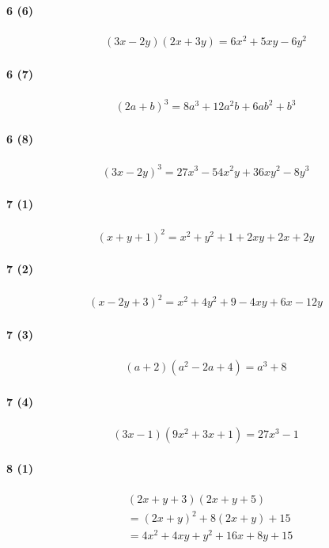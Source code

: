 \documentclass[fleqn,a4j,dvipdfmx,uplatex,twocolumn]{jsarticle}
\begin{document}
\paragraph{6 (6)}
\begin{align*}
  (3 x-2 y)(2 x+3 y)= 6 x^{2}+5 x y-6 y^{2}
\end{align*}

\paragraph{6 (7)}
\begin{align*}
  (2 a+b)^{3} = 8 a^{3}+12 a^{2} b+6 a b^{2}+b^{3}
\end{align*}

\paragraph{6 (8)}
\begin{align*}
  (3 x-2 y)^{3} = 27 x^{3}-54 x^{2} y+36 x y^{2}-8 y^{3}
\end{align*}

\paragraph{7 (1)}
\begin{align*}
  (x+y+1)^{2} = x^{2}+y^{2}+1+2xy+2x+2y
\end{align*}

\paragraph{7 (2)}
\begin{align*}
  (x-2y+3)^{2} = x^{2}+4y^{2}+9-4xy+6x-12y
\end{align*}

\paragraph{7 (3)}
\begin{align*}
  (a+2)(a^{2}-2a+4) = a^{3}+8
\end{align*}

\paragraph{7 (4)}
\begin{align*}
  (3x-1)(9x^{2}+3x+1) = 27x^{3}-1
\end{align*}

\paragraph{8 (1)}
\begin{align*}
  & (2x+y+3)(2x+y+5) \\
  &= (2x+y)^{2}+8(2x+y)+15 \\
  &= 4x^{2}+4xy+y^{2}+16x+8y+15
\end{align*}
\end{document}
